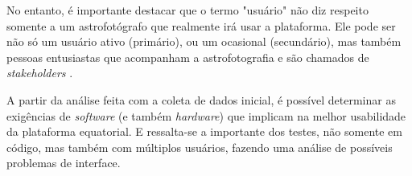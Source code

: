 No entanto, é importante destacar que o termo "usuário" não diz respeito somente a um astrofotógrafo que realmente irá usar a plataforma. Ele pode ser não só um usuário ativo (primário), ou um ocasional (secundário), mas também pessoas entusiastas que acompanham a astrofotografia e são chamados de \textit{stakeholders} \cite{BarbosaEtAl2021InteracaoHumanoComputadorExperiencia}.

A partir da análise feita com a coleta de dados inicial, é possível determinar as exigências de \textit{software} (e também \textit{hardware}) que implicam na melhor usabilidade da plataforma equatorial. E ressalta-se a importante dos testes, não somente em código, mas também com múltiplos usuários, fazendo uma análise de possíveis problemas de interface.